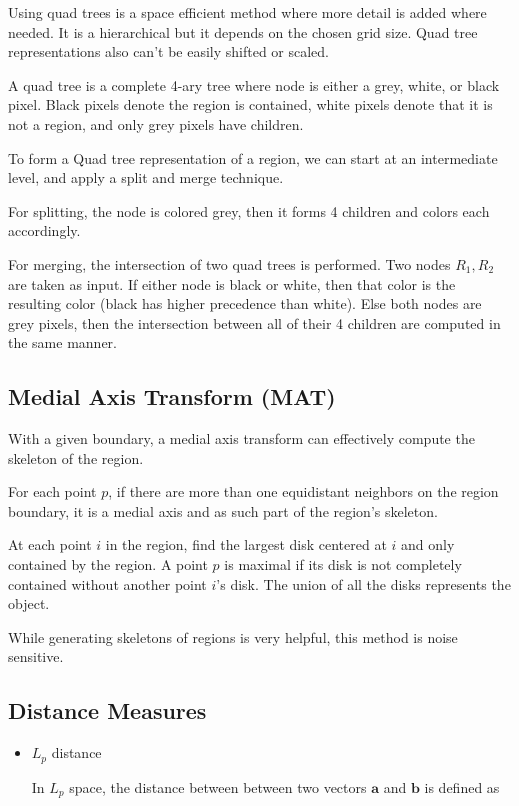 \documentclass{article}
\begin{document}
\begin{multicols}{3}
Using quad trees is a space efficient method where more detail is added where needed. It is a hierarchical but it depends on the chosen grid size. Quad tree representations also can't be easily shifted or scaled.

A quad tree is a complete 4-ary tree where node is either a grey, white, or black pixel. Black pixels denote the region is contained, white pixels denote that it is not a region, and only grey pixels have children. 

To form a Quad tree representation of a region, we can start at an intermediate level, and apply a split and merge technique. 

For splitting, the node is colored grey, then it forms 4 children and colors each accordingly.

For merging, the intersection of two quad trees is performed. Two nodes $R_1, R_2$ are taken as input. If either node is black or white, then that color is the resulting color (black has higher precedence than white). Else both nodes are grey pixels, then the intersection between all of their 4 children are computed in the same manner.

\subsection{Medial Axis Transform (MAT)}

With a given boundary, a medial axis transform can effectively compute the skeleton of the region.

For each point $p$, if there are more than one equidistant neighbors on the region boundary, it is a medial axis and as such part of the region's skeleton.

At each point $i$ in the region, find the largest disk centered at $i$ and only contained by the region. A point $p$ is maximal if its disk is not completely contained without another point $i$'s disk. The union of all the disks represents the object.

While generating skeletons of regions is very helpful, this method is noise sensitive.

\subsection{Distance Measures}

\begin{itemize}
\itemsep0em
\item $L_p$ distance
  
In $L_p$ space, the distance between between two vectors $\mathbf{a}$ and $\mathbf{b}$ is defined as


\end{itemize}
\end{multicols}
\end{document}
